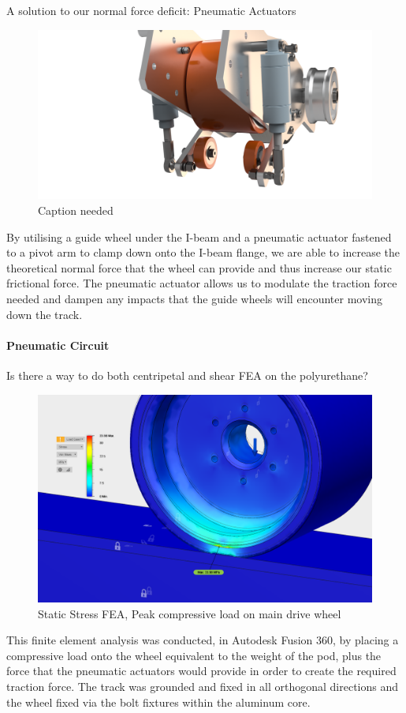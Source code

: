 \documentclass[main.tex]{subfile}
\begin{document}
    A solution to our normal force deficit: Pneumatic Actuators
    \begin{figure}[H]
        \centering
        \includegraphics[width=\linewidth]{images/fig20}
        \caption{Caption needed}
    \end{figure}
    By utilising a guide wheel under the I-beam and a pneumatic actuator fastened to a pivot arm to clamp down onto the I-beam flange, we are able to increase the theoretical normal force that the wheel can provide and thus increase our static frictional force. The pneumatic actuator allows us to modulate the traction force needed and dampen any impacts that the guide wheels will encounter moving down the track.

    \paragraph{Pneumatic Circuit}
    Is there a way to do both centripetal and shear FEA on the polyurethane?\\
    \begin{figure}[H]
        \centering
        \includegraphics[width=\linewidth]{images/fig21}
        \caption{Static Stress FEA, Peak compressive load on main drive wheel}
    \end{figure}
    This finite element analysis was conducted, in Autodesk Fusion 360, by placing a compressive load onto the wheel equivalent to the weight of the pod, plus the force that the pneumatic actuators would provide in order to create the required traction force. The track was grounded and fixed in all orthogonal directions and the wheel fixed via the bolt fixtures within the aluminum core.\\
\end{document}
